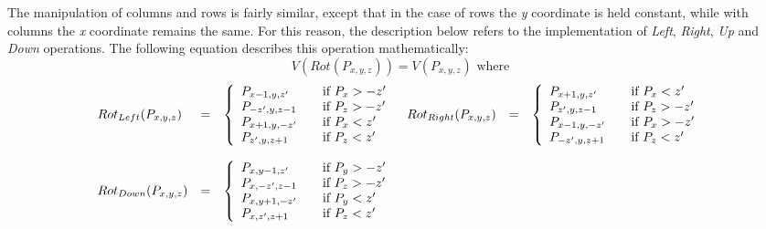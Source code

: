 The manipulation of columns and rows is fairly similar, except that in the case of rows the \emph{y} coordinate is held constant, while with columns the \emph{x} coordinate remains the same. For this reason, the description below refers to the implementation of \emph{Left}, \emph{Right}, \emph{Up} and \emph{Down} operations. The following equation describes this operation mathematically:\\
\begin{displaymath}V(Rot(P_{x, y, z}))  = V(P_{x, y, z})  \mbox{ where}\end{displaymath}
\footnotesize
\begin{align*}
\begin{array}{ l l l l l l }
		Rot_{Left}(P_{x,y,z}) & = & \left\{ 
			\begin{array}{l l l}
			  P_{x-1,y,z^{\prime}} & \quad \mbox{if } P_x > -z^{\prime} \\ 
			  P_{-z^{\prime},y,z-1} & \quad \mbox{if } P_z > -z^{\prime} \\ 
			  P_{x+1,y,-z^{\prime}} & \quad \mbox{if } P_x < z^{\prime} \\ 
			  P_{z^{\prime},y,z+1} & \quad \mbox{if } P_z < z^{\prime} \\ 
			 \end{array} \right. 
			& Rot_{Right}(P_{x,y,z})& = & \left\{  \begin{array}{l l l}
			  P_{x+1,y,z^{\prime}} & \quad \mbox{if } P_x < z^{\prime} \\ 
			  P_{z^{\prime},y,z-1} & \quad \mbox{if } P_z > -z^{\prime} \\ 
			  P_{x-1,y,-z^{\prime}} & \quad \mbox{if } P_x > -z^{\prime} \\ 
			  P_{-z^{\prime},y,z+1} & \quad \mbox{if } P_z < z^{\prime} \\ 
			 \end{array} \right. \\
			& & & & & \\
		Rot_{Down}(P_{x,y,z}) & = & \left\{ 
			\begin{array}{l l l}
			  P_{x,y-1,z^{\prime}} & \quad \mbox{if } P_y > -z^{\prime} \\ 
			  P_{x,-z^{\prime},z-1} & \quad \mbox{if } P_z > -z^{\prime} \\ 
			  P_{x,y+1,-z^{\prime}} & \quad \mbox{if } P_y < z^{\prime} \\ 
			  P_{x,z^{\prime},z+1} & \quad \mbox{if } P_z < z^{\prime} \\ 
			\end{array} \right. 

\end{array}
\end{align*}
